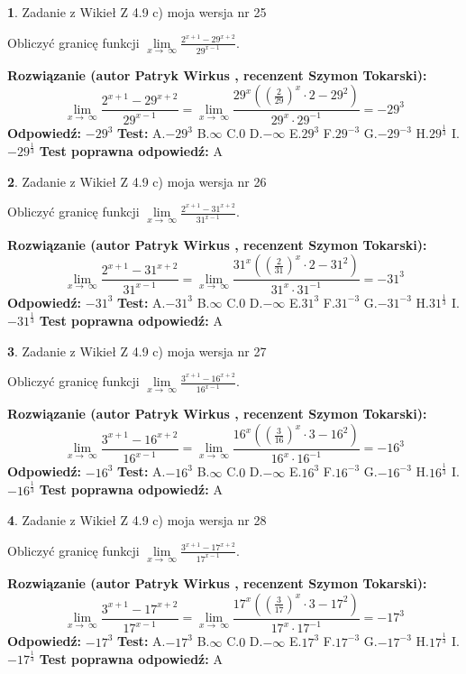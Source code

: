 \documentclass[12pt, a4paper]{article}
\theoremstyle{definition} %
\newtheorem{zad}{}
\newcommand{\zadStart}[1]{\begin{zad}#1\newline}
\newcommand{\zadStop}{\end{zad}}
\newcommand{\rozwStart}[2]{\noindent \textbf{Rozwiązanie (autor #1 , recenzent #2): }\newline}
\newcommand{\rozwStop}{\newline}
\newcommand{\odpStart}{\noindent \textbf{Odpowiedź:}\newline}
\newcommand{\odpStop}{\newline}
\newcommand{\testStart}{\noindent \textbf{Test:}\newline}
\newcommand{\testStop}{\newline}
\newcommand{\kluczStart}{\noindent \textbf{Test poprawna odpowiedź:}\newline}
\newcommand{\kluczStop}{\newline}
\begin{document}
\zadStart{Zadanie z Wikieł Z 4.9 c) moja wersja nr 25}


Obliczyć granicę funkcji  $\lim\limits_{x\to\ \infty}\frac{2^{x+1}-29^{x+2}}{29^{x-1}}$.
\zadStop
\rozwStart{Patryk Wirkus}{Szymon Tokarski}
$$\lim\limits_{x\to\ \infty}\frac{2^{x+1}-29^{x+2}}{29^{x-1}}=\lim\limits_{x\to\ \infty}\frac{29^{x}((\frac{2}{29})^{x}\cdot 2 -29^{2})}{29^{x}\cdot 29^{-1}} = -29^{3}$$
\rozwStop
\odpStart
$-29^{3}$
\odpStop
\testStart
A.$-29^{3}$ B.$\infty$ C.$0$ D.$-\infty$ E.$29^{3}$
F.$29^{-3}$ G.$-29^{-3}$
H.$29^{\frac{1}{3}}$
I.$-29^{\frac{1}{3}}$
\testStop
\kluczStart
A
\kluczStop



\zadStart{Zadanie z Wikieł Z 4.9 c) moja wersja nr 26}


Obliczyć granicę funkcji  $\lim\limits_{x\to\ \infty}\frac{2^{x+1}-31^{x+2}}{31^{x-1}}$.
\zadStop
\rozwStart{Patryk Wirkus}{Szymon Tokarski}
$$\lim\limits_{x\to\ \infty}\frac{2^{x+1}-31^{x+2}}{31^{x-1}}=\lim\limits_{x\to\ \infty}\frac{31^{x}((\frac{2}{31})^{x}\cdot 2 -31^{2})}{31^{x}\cdot 31^{-1}} = -31^{3}$$
\rozwStop
\odpStart
$-31^{3}$
\odpStop
\testStart
A.$-31^{3}$ B.$\infty$ C.$0$ D.$-\infty$ E.$31^{3}$
F.$31^{-3}$ G.$-31^{-3}$
H.$31^{\frac{1}{3}}$
I.$-31^{\frac{1}{3}}$
\testStop
\kluczStart
A
\kluczStop



\zadStart{Zadanie z Wikieł Z 4.9 c) moja wersja nr 27}


Obliczyć granicę funkcji  $\lim\limits_{x\to\ \infty}\frac{3^{x+1}-16^{x+2}}{16^{x-1}}$.
\zadStop
\rozwStart{Patryk Wirkus}{Szymon Tokarski}
$$\lim\limits_{x\to\ \infty}\frac{3^{x+1}-16^{x+2}}{16^{x-1}}=\lim\limits_{x\to\ \infty}\frac{16^{x}((\frac{3}{16})^{x}\cdot 3 -16^{2})}{16^{x}\cdot 16^{-1}} = -16^{3}$$
\rozwStop
\odpStart
$-16^{3}$
\odpStop
\testStart
A.$-16^{3}$ B.$\infty$ C.$0$ D.$-\infty$ E.$16^{3}$
F.$16^{-3}$ G.$-16^{-3}$
H.$16^{\frac{1}{3}}$
I.$-16^{\frac{1}{3}}$
\testStop
\kluczStart
A
\kluczStop



\zadStart{Zadanie z Wikieł Z 4.9 c) moja wersja nr 28}


Obliczyć granicę funkcji  $\lim\limits_{x\to\ \infty}\frac{3^{x+1}-17^{x+2}}{17^{x-1}}$.
\zadStop
\rozwStart{Patryk Wirkus}{Szymon Tokarski}
$$\lim\limits_{x\to\ \infty}\frac{3^{x+1}-17^{x+2}}{17^{x-1}}=\lim\limits_{x\to\ \infty}\frac{17^{x}((\frac{3}{17})^{x}\cdot 3 -17^{2})}{17^{x}\cdot 17^{-1}} = -17^{3}$$
\rozwStop
\odpStart
$-17^{3}$
\odpStop
\testStart
A.$-17^{3}$ B.$\infty$ C.$0$ D.$-\infty$ E.$17^{3}$
F.$17^{-3}$ G.$-17^{-3}$
H.$17^{\frac{1}{3}}$
I.$-17^{\frac{1}{3}}$
\testStop
\kluczStart
A
\kluczStop
\end{document}
